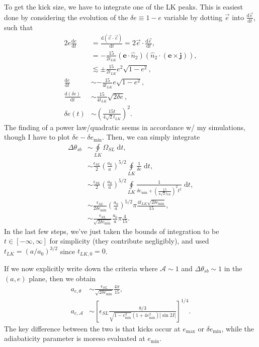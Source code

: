 \documentclass[11pt,
        usenames, %
        dvipsnames %
    ]{article}
\newcommand*{\rd}[2]{\frac{\mathrm{d}#1}{\mathrm{d}#2}}
\newcommand*{\bm}[1]{\boldsymbol{\mathbf{#1}}}
\newcommand*{\abs}[1]{\left|#1\right|}
\newcommand*{\p}[1]{\left(#1\right)}
\newcommand*{\s}[1]{\left[#1\right]}
\begin{document}
To get the kick size, we have to integrate one of the LK peaks. This is easiest
done by considering the evolution of the $\delta e \equiv 1 - e$ variable by
dotting $\vec{e}$ into $\rd{\vec{e}}{t}$, such that
\begin{align}
    2e\rd{e}{t} &= \rd{\p{\vec{e} \cdot \vec{e}}}{t}
        = 2\vec{e} \cdot \rd{\vec{e}}{t},\\
        &= -\frac{15}{2t_{LK}}\p{\bm{e} \cdot \hat{n}_2}
            \p{\hat{n}_2 \cdot \p{\bm{e} \times \bm{j}}},\\
        &\lesssim \pm\frac{15}{2t_{LK}}e^2\sqrt{1 - e^2},\\
    \rd{e}{t} &\sim -\frac{15}{4t_{LK}}e\sqrt{1 - e^2},\\
    \rd{(\delta e)}{t} &\sim \frac{15}{4t_{LK}}\sqrt{2\delta e},\\
    \delta e(t) &\sim \p{\frac{15 t}{4\sqrt{2}t_{LK}}}^2.
\end{align}
The finding of a power law/quadratic seems in accordance w/ my simulations,
though I have to plot $\delta e - \delta e_{\min}$. Then, we can simply
integrate
\begin{align}
    \Delta \theta_{sb} &\sim \oint\limits_{LK}
            \Omega_{SL}\;\mathrm{d}t,\\
        &\sim \frac{\epsilon_{SL}}{2}\p{\frac{a_0}{a}}^{5/2}
            \oint\limits_{LK} \frac{1}{\delta e}\;\mathrm{d}t,\\
        &\sim \frac{\epsilon_{SL}}{2}\p{\frac{a_0}{a}}^{5/2}
            \oint\limits_{LK}
            \frac{1}{\delta e_{\min} + \p{\frac{15}{4\sqrt{2}t_{LK}}}^2
                t^2}\;\mathrm{d}t,\\
        &\sim \frac{\epsilon_{SL}}{2 \delta e_{\min}}\p{\frac{a_0}{a}}^{5/2}
            \pi \frac{4t_{LK} \sqrt{2 \delta e_{\min}}}{15},\\
        &\sim \frac{\epsilon_{SL}}{\sqrt{2\delta e_{\min}}}\frac{a_0}{a}
            \pi \frac{4}{15}.
\end{align}
In the last few steps, we've just taken the bounds of integration to be $t \in
[-\infty, \infty]$ for simplicity (they contribute negligibly), and used $t_{LK}
= (a / a_0)^{3/2}$ since $t_{LK, 0} = 0$.

If we now explicitly write down the criteria where $\mathcal{A} \sim 1$ and
$\Delta \theta_{sb} \sim 1$ in the $(a, e)$ plane, then we obtain
\begin{align}
    a_{c,\theta} &\sim \frac{\epsilon_{SL}}{\sqrt{2\delta e_{\min}}}
        \frac{4\pi}{15},\\
    a_{c, \mathcal{A}} &\sim
        \s{\epsilon_{SL}\frac{8/3}{\sqrt{1 - e_{\min}^2}
            \p{1 + 4e_{\min}^2}\abs{\sin 2I}}}^{1/4}.
\end{align}
The key difference between the two is that kicks occur at $e_{\max}$ or $\delta
e_{\min}$, while the adiabaticity parameter is moreso evaluated at $e_{\min}$.
\end{document}
